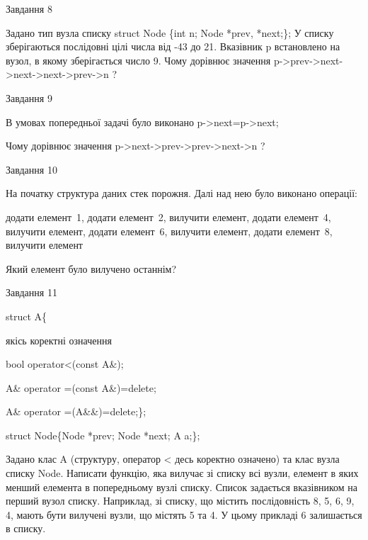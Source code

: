 \documentclass[12pt, ukrainian]{article}
\begin{document}
{{{{\begin{minipage}[t]{7cm}
\end{minipage}
               
{\begin{center}Завдання {8}\end{center}}
\vspace{-6mm}
Задано тип вузла списку
struct Node \{int n; Node *prev, *next;\};
У списку зберігаються послідовні цілі числа від -43 до 21. Вказівник p встановлено на вузол, в якому зберігається число 9.
Чому дорівнює значення p->prev->next->next->next->prev->n ?\par

               
{\begin{center}Завдання {9}\end{center}}
\vspace{-6mm}
В умовах попередньої задачі було виконано p->next=p->next;

Чому дорівнює значення p->next->prev->prev->next->n ?\par

\newpage
               
{\begin{center}Завдання {10}\end{center}}
\vspace{-6mm}
На початку структура даних стек порожня. Далі над нею було виконано операції:

додати елемент~1, додати елемент~2, вилучити елемент, додати елемент~4, вилучити елемент, додати елемент~6, вилучити елемент, додати елемент~8, вилучити елемент

Який елемент було вилучено останнім?\par

               
{\begin{center}Завдання {11}\end{center}}
\vspace{-6mm}

struct A\{

\quad  якісь коректні означення

\quad  bool operator<(const A\&);

\quad A\& operator =(const A\&)=delete;

\quad  A\& operator =(A\&\&)=delete;\};

struct Node\{Node *prev; Node *next; A a;\};

Задано клас A (структуру, оператор < десь коректно означено) та клас вузла списку Node. Написати функцію, яка вилучає зі списку всі вузли, елемент в яких менший елемента в попередньому вузлі списку. Список задається вказівником на перший вузол списку. Наприклад, зі списку, що містить послідовність 8, 5, 6, 9, 4, мають бути вилучені вузли, що містять 5 та 4. У цьому прикладі 6 залишається в списку.

}}}}
\end{document}
